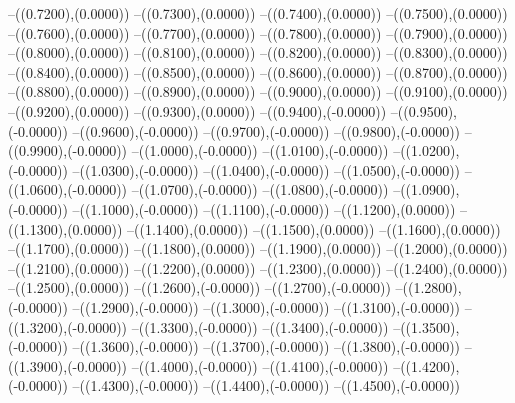 {	--({\sx*(0.7200)},{\sy*(0.0000)})
	--({\sx*(0.7300)},{\sy*(0.0000)})
	--({\sx*(0.7400)},{\sy*(0.0000)})
	--({\sx*(0.7500)},{\sy*(0.0000)})
	--({\sx*(0.7600)},{\sy*(0.0000)})
	--({\sx*(0.7700)},{\sy*(0.0000)})
	--({\sx*(0.7800)},{\sy*(0.0000)})
	--({\sx*(0.7900)},{\sy*(0.0000)})
	--({\sx*(0.8000)},{\sy*(0.0000)})
	--({\sx*(0.8100)},{\sy*(0.0000)})
	--({\sx*(0.8200)},{\sy*(0.0000)})
	--({\sx*(0.8300)},{\sy*(0.0000)})
	--({\sx*(0.8400)},{\sy*(0.0000)})
	--({\sx*(0.8500)},{\sy*(0.0000)})
	--({\sx*(0.8600)},{\sy*(0.0000)})
	--({\sx*(0.8700)},{\sy*(0.0000)})
	--({\sx*(0.8800)},{\sy*(0.0000)})
	--({\sx*(0.8900)},{\sy*(0.0000)})
	--({\sx*(0.9000)},{\sy*(0.0000)})
	--({\sx*(0.9100)},{\sy*(0.0000)})
	--({\sx*(0.9200)},{\sy*(0.0000)})
	--({\sx*(0.9300)},{\sy*(0.0000)})
	--({\sx*(0.9400)},{\sy*(-0.0000)})
	--({\sx*(0.9500)},{\sy*(-0.0000)})
	--({\sx*(0.9600)},{\sy*(-0.0000)})
	--({\sx*(0.9700)},{\sy*(-0.0000)})
	--({\sx*(0.9800)},{\sy*(-0.0000)})
	--({\sx*(0.9900)},{\sy*(-0.0000)})
	--({\sx*(1.0000)},{\sy*(-0.0000)})
	--({\sx*(1.0100)},{\sy*(-0.0000)})
	--({\sx*(1.0200)},{\sy*(-0.0000)})
	--({\sx*(1.0300)},{\sy*(-0.0000)})
	--({\sx*(1.0400)},{\sy*(-0.0000)})
	--({\sx*(1.0500)},{\sy*(-0.0000)})
	--({\sx*(1.0600)},{\sy*(-0.0000)})
	--({\sx*(1.0700)},{\sy*(-0.0000)})
	--({\sx*(1.0800)},{\sy*(-0.0000)})
	--({\sx*(1.0900)},{\sy*(-0.0000)})
	--({\sx*(1.1000)},{\sy*(-0.0000)})
	--({\sx*(1.1100)},{\sy*(-0.0000)})
	--({\sx*(1.1200)},{\sy*(0.0000)})
	--({\sx*(1.1300)},{\sy*(0.0000)})
	--({\sx*(1.1400)},{\sy*(0.0000)})
	--({\sx*(1.1500)},{\sy*(0.0000)})
	--({\sx*(1.1600)},{\sy*(0.0000)})
	--({\sx*(1.1700)},{\sy*(0.0000)})
	--({\sx*(1.1800)},{\sy*(0.0000)})
	--({\sx*(1.1900)},{\sy*(0.0000)})
	--({\sx*(1.2000)},{\sy*(0.0000)})
	--({\sx*(1.2100)},{\sy*(0.0000)})
	--({\sx*(1.2200)},{\sy*(0.0000)})
	--({\sx*(1.2300)},{\sy*(0.0000)})
	--({\sx*(1.2400)},{\sy*(0.0000)})
	--({\sx*(1.2500)},{\sy*(0.0000)})
	--({\sx*(1.2600)},{\sy*(-0.0000)})
	--({\sx*(1.2700)},{\sy*(-0.0000)})
	--({\sx*(1.2800)},{\sy*(-0.0000)})
	--({\sx*(1.2900)},{\sy*(-0.0000)})
	--({\sx*(1.3000)},{\sy*(-0.0000)})
	--({\sx*(1.3100)},{\sy*(-0.0000)})
	--({\sx*(1.3200)},{\sy*(-0.0000)})
	--({\sx*(1.3300)},{\sy*(-0.0000)})
	--({\sx*(1.3400)},{\sy*(-0.0000)})
	--({\sx*(1.3500)},{\sy*(-0.0000)})
	--({\sx*(1.3600)},{\sy*(-0.0000)})
	--({\sx*(1.3700)},{\sy*(-0.0000)})
	--({\sx*(1.3800)},{\sy*(-0.0000)})
	--({\sx*(1.3900)},{\sy*(-0.0000)})
	--({\sx*(1.4000)},{\sy*(-0.0000)})
	--({\sx*(1.4100)},{\sy*(-0.0000)})
	--({\sx*(1.4200)},{\sy*(-0.0000)})
	--({\sx*(1.4300)},{\sy*(-0.0000)})
	--({\sx*(1.4400)},{\sy*(-0.0000)})
	--({\sx*(1.4500)},{\sy*(-0.0000)})
}
